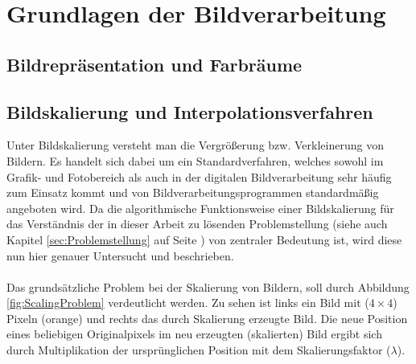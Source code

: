 \documentclass[
fontsize=10pt, 
listof = totoc,
parskip = half	
]{report}
\begin{document}
\section{Grundlagen der Bildverarbeitung}
\label{GrundlagenBildverarbeitung}

\subsection{Bildrepräsentation und Farbräume}
\label{Bildrep}

\subsection{Bildskalierung und Interpolationsverfahren}
\label{subsec:SkalierungUndInterpolation}

Unter Bildskalierung versteht man die Vergrößerung bzw. Verkleinerung von Bildern. Es handelt sich dabei um ein Standardverfahren, welches sowohl im Grafik- und Fotobereich als auch in der digitalen Bildverarbeitung sehr häufig zum Einsatz kommt und von Bildverarbeitungsprogrammen standardmäßig angeboten wird. Da die algorithmische Funktionsweise einer Bildskalierung für das Verständnis der in dieser Arbeit zu lösenden Problemstellung (siehe auch Kapitel \ref{sec:Problemstellung} auf Seite \pageref{sec:Problemstellung}) von zentraler Bedeutung ist, wird diese nun hier genauer Untersucht und beschrieben.
\\\\
Das grundsätzliche Problem bei der Skalierung von Bildern, soll durch Abbildung \ref{fig:ScalingProblem} verdeutlicht werden. Zu sehen ist links ein Bild mit ($4\times 4$) Pixeln (orange) und rechts das durch Skalierung erzeugte Bild. Die neue Position eines beliebigen Originalpixels im neu erzeugten (skalierten) Bild ergibt sich durch Multiplikation der ursprünglichen Position mit dem Skalierungsfaktor ($\lambda$).
\end{document}
